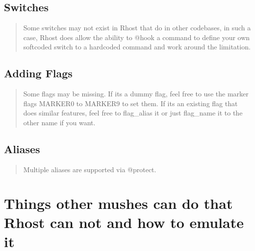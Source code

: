 \documentclass[letterpaper,10pt,english]{sphinxmanual}
\begin{document}
\subsection{Switches}
\label{\detokenize{differences:switches}}\begin{quote}

\sphinxAtStartPar
Some switches may not exist in Rhost that do in other codebases, in such
a case, Rhost does allow the ability to @hook a command to define your own
softcoded switch to a hardcoded command and work around the limitation.
\end{quote}


\subsection{Adding Flags}
\label{\detokenize{differences:adding-flags}}\begin{quote}

\sphinxAtStartPar
Some flags may be missing.  If it\textquotesingle{}s a dummy flag, feel free to use the
marker flags MARKER0 to MARKER9 to set them.  If it\textquotesingle{}s an existing flag
that does similar features, feel free to flag\_alias it or just flag\_name
it to the other name if you want.
\end{quote}


\subsection{Aliases}
\label{\detokenize{differences:aliases}}\begin{quote}

\sphinxAtStartPar
Multiple aliases are supported via @protect.
\end{quote}


\section{Things other mushes can do that Rhost can not and how to emulate it}
\label{\detokenize{differences:things-other-mushes-can-do-that-rhost-can-not-and-how-to-emulate-it}}
\end{document}
